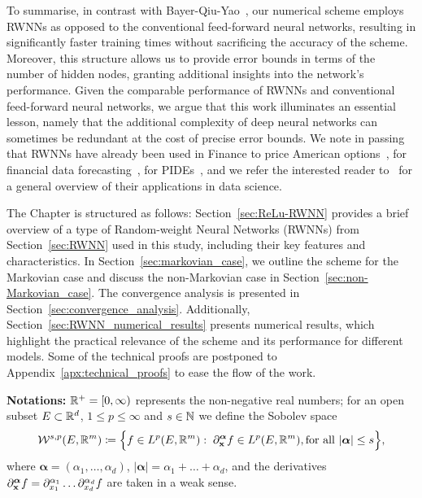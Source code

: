 To summarise, in contrast with Bayer-Qiu-Yao~\cite{Bayer2022PricingSPDEs}, our numerical scheme employs RWNNs as opposed to the conventional feed-forward neural networks, resulting in significantly faster training times without sacrificing the accuracy of the scheme. 
Moreover, this structure allows us to provide error bounds in terms of the number of hidden nodes, granting additional insights into the network's performance. Given the comparable performance of RWNNs and conventional feed-forward neural networks, we argue that this work illuminates an essential lesson, namely that the additional complexity of deep neural networks can sometimes be redundant at the cost of precise error bounds.
We note in passing that RWNNs have already been used in Finance to price American options~\cite{Herrera2021OptimalNetworks}, 
for financial data forecasting~\cite{Liu2018FinancialNetwork}, for PIDEs~\cite{Gonon2023DeepEquations},
and we refer the interested reader to~\cite{Cao2018AWeights} for a general overview of their applications in data science.

The Chapter is structured as follows: Section~\ref{sec:ReLu-RWNN} provides a brief overview of a type of Random-weight Neural Networks (RWNNs) from Section~\ref{sec:RWNN} used in this study, including their key features and characteristics. 
In Section~\ref{sec:markovian_case}, we outline the scheme for the Markovian case and discuss the non-Markovian case in Section~\ref{sec:non-Markovian_case}.
The convergence analysis is presented in Section~\ref{sec:convergence_analysis}. Additionally, Section~\ref{sec:RWNN_numerical_results} presents numerical results, which highlight the practical relevance of the scheme and its performance for different models.
Some of the technical proofs are postponed to Appendix~\ref{apx:technical_proofs} to ease the flow of the work.


\textbf{Notations:}
$\mathbb{R}^+ = [0,\infty)$ represents the non-negative real numbers;
for an open subset $E\subset \mathbb{R}^d$, 
$1\leq p \leq \infty$ and $s \in \mathbb{N}$ 
we define the Sobolev space
$$
\mathcal{W}^{s, p}(E, \mathbb{R}^m)
\coloneqq  \Big\{f \in L^p(E, \mathbb{R}^m): \; \partial_{\mathbf{x}}^{\boldsymbol{\alpha}} f \in L^p(E, \mathbb{R}^m), \text{for all } |\boldsymbol{\alpha}| \leq s\Big\},
$$
where $\boldsymbol{\alpha} = \left(\alpha_1, \ldots, \alpha_d\right)$, $|\boldsymbol{\alpha}|=\alpha_1+\ldots+\alpha_d$, and the derivatives $\partial_{\mathbf{x}}^{\boldsymbol{\alpha}} f = \partial_{x_1}^{\alpha_1} \dots \partial_{x_d}^{\alpha_d} f$ are taken in a weak sense.

